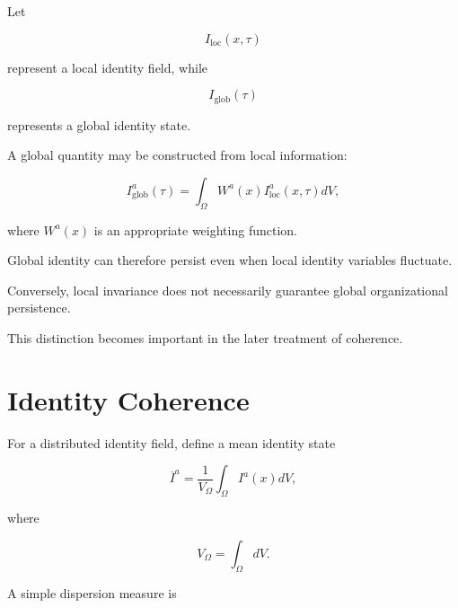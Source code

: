 \documentclass[12pt,oneside]{book}
\begin{document}
Let

\begin{equation}
    I_{\mathrm{loc}}(x,\tau)
\end{equation}

represent a local identity field, while

\begin{equation}
    I_{\mathrm{glob}}(\tau)
\end{equation}

represents a global identity state.

A global quantity may be constructed from local information:

\begin{equation}
    I_{\mathrm{glob}}^a(\tau)
    =
    \int_{\Omega}
        W^a(x)
        I_{\mathrm{loc}}^a(x,\tau)
    dV,
    \label{eq:global-identity-from-local}
\end{equation}

where \(W^a(x)\) is an appropriate weighting function.

Global identity can therefore persist even when local identity
variables fluctuate.

Conversely, local invariance does not necessarily guarantee
global organizational persistence.

This distinction becomes important in the later treatment of
coherence.


\section{Identity Coherence}
\label{sec:identity-coherence}

For a distributed identity field, define a mean identity state

\begin{equation}
    \overline{I}^a
    =
    \frac{1}{V_{\Omega}}
    \int_{\Omega}
        I^a(x)
    dV,
    \label{eq:mean-identity-state}
\end{equation}

where

\begin{equation}
    V_{\Omega}
    =
    \int_{\Omega}
    dV.
\end{equation}

A simple dispersion measure is
\end{document}
